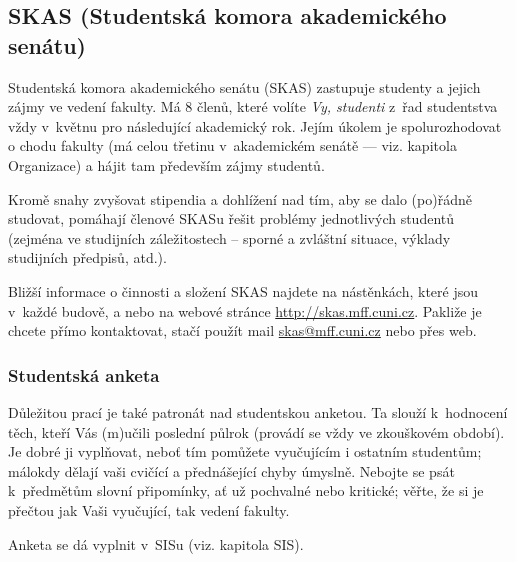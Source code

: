 \subsection{SKAS (Studentská komora akademického senátu)}
Studentská komora akademického senátu (SKAS) zastupuje studenty a jejich zájmy ve vedení fakulty. Má 8 členů, které volíte \emph{Vy, studenti} z~řad studentstva vždy v~květnu pro následující akademický rok. Jejím úkolem je spolurozhodovat o chodu fakulty (má celou třetinu v~akademickém senátě --- viz. kapitola Organizace) a hájit tam především zájmy studentů.

Kromě snahy zvyšovat stipendia a dohlížení nad tím, aby se dalo (po)řádně studovat, pomáhají členové SKASu řešit problémy jednotlivých studentů (zejména ve studijních záležitostech – sporné a zvláštní situace, výklady studijních předpisů, atd.). 

Bližší informace o činnosti a složení SKAS najdete na nástěnkách, které jsou v~každé budově, a nebo na webové stránce \url{http://skas.mff.cuni.cz}. Pakliže je chcete přímo kontaktovat, stačí použít mail \url{skas@mff.cuni.cz} nebo přes web.

\subsubsection{Studentská anketa}
Důležitou prací je také patronát nad studentskou anketou. Ta slouží k~hodnocení těch, kteří Vás (m)učili poslední půlrok (provádí se vždy ve zkouškovém období). Je dobré ji vyplňovat, neboť tím pomůžete vyučujícím i ostatním
studentům; málokdy dělají vaši cvičící a přednášející chyby
úmyslně. Nebojte se psát k~předmětům slovní připomínky, ať už
pochvalné nebo kritické; věřte, že si je přečtou jak Vaši
vyučující, tak vedení fakulty.

Anketa se dá vyplnit v~SISu (viz. kapitola SIS).
